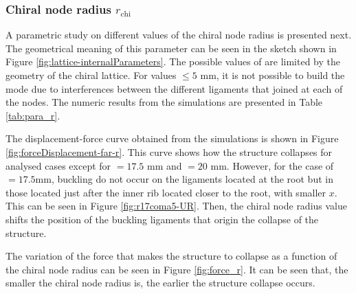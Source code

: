     \clearpage
    \subsubsection{Chiral node radius $r_{\mathrm{chi}}$}

      A parametric study on different values of the chiral node radius \chir is presented next. The geometrical meaning of this parameter can be seen in the sketch shown in Figure \ref{fig:lattice-internalParameters}. The possible values of \chir are limited by the geometry of the chiral lattice. For values \chir$\le 5$ mm, it is not possible to build the mode due to interferences between the different ligaments that joined at each of the nodes. The numeric results from the simulations are presented in Table \ref{tab:para_r}.

      The displacement-force curve obtained from the simulations is shown in Figure \ref{fig:forceDisplacement-far-r}. This curve shows how the structure collapses for analysed cases except for \chir$ = 17.5$ mm and \chir$ = 20$ mm. However, for the case of \chir$= 17.5$mm, buckling do not occur on the ligaments located at the root but in those located just after the inner rib located closer to the root, with smaller $x$. This can be seen in Figure \ref{fig:r17coma5-UR}. Then, the chiral node radius \chir value shifts the position of the buckling ligaments that origin the collapse of the structure.

      The variation of the force that makes the structure to collapse as a function of the chiral node radius \chir can be seen in Figure \ref{fig:force_r}. It can be seen that, the smaller the chiral node radius \chir is, the earlier the structure collapse occurs. 

